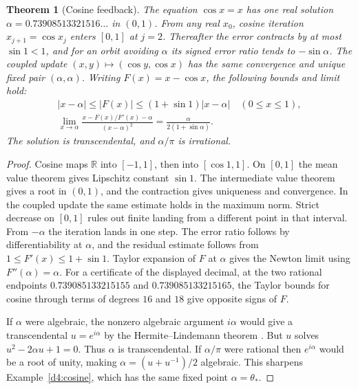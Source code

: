 \documentclass[11pt,reqno]{amsart}
\newtheorem{theorem}{Theorem}[section]
\theoremstyle{definition}
\theoremstyle{remark}
\numberwithin{equation}{section}
\newcommand{\R}{\mathbb{R}}
\begin{document}
\begin{theorem}[Cosine feedback]\label{m6:cosine}
The equation \(\cos x=x\) has one real solution
\(\alpha=0.73908513321516\ldots\) in \((0,1)\).
From any real \(x_0\), cosine iteration \(x_{j+1}=\cos x_j\)
enters \([0,1]\) at \(j=2\). Thereafter the error contracts by
at most \(\sin1<1\), and for an orbit avoiding \(\alpha\)
its signed error ratio tends to \(-\sin\alpha\).
The coupled update \((x,y)\mapsto(\cos y,\cos x)\) has the
same convergence and unique fixed pair \((\alpha,\alpha)\).
Writing \(F(x)=x-\cos x\), the following bounds and limit hold:
\[
 \begin{gathered}
 |x-\alpha|\le |F(x)|\le (1+\sin1)|x-\alpha|\quad(0\le x\le1),\\
 \lim_{x\to\alpha}\frac{x-F(x)/F'(x)-\alpha}{(x-\alpha)^2}
       =\frac{\alpha}{2(1+\sin\alpha)} .
 \end{gathered}
\]
The solution is transcendental, and \(\alpha/\pi\) is irrational.
\end{theorem}
\begin{proof}
Cosine maps \(\R\) into \([-1,1]\), then into \([\cos1,1]\).
On \([0,1]\) the mean value theorem gives Lipschitz constant
\(\sin1\). The intermediate value theorem gives a root in
\((0,1)\), and the contraction gives uniqueness and convergence.
In the coupled update the same estimate holds in the maximum
norm. Strict decrease on \([0,1]\) rules out finite landing
from a different point in that interval. From \(-\alpha\)
the iteration lands in one step. The error ratio follows by
differentiability at \(\alpha\), and the residual estimate follows
from \(1\le F'(x)\le1+\sin1\). Taylor expansion of \(F\) at
\(\alpha\) gives the Newton limit using
\(F''(\alpha)=\alpha\). For a certificate of the displayed
decimal, at the two rational endpoints
\(0.739085133215155\) and \(0.739085133215165\), the Taylor
bounds for cosine through terms of degrees \(16\) and \(18\)
give opposite signs of \(F\).

If \(\alpha\) were algebraic, the nonzero algebraic argument
\(i\alpha\) would give a transcendental \(u=e^{i\alpha}\) by
the Hermite--Lindemann theorem \cite{m6:Baker}. But \(u\) solves
\(u^2-2\alpha u+1=0\). Thus \(\alpha\) is transcendental.
If \(\alpha/\pi\) were rational then \(e^{i\alpha}\) would be
a root of unity, making \(\alpha=(u+u^{-1})/2\) algebraic.  This sharpens Example~\ref{d4:cosine}, which has the same fixed point
\(\alpha=\theta_*\).
\end{proof}
\end{document}
